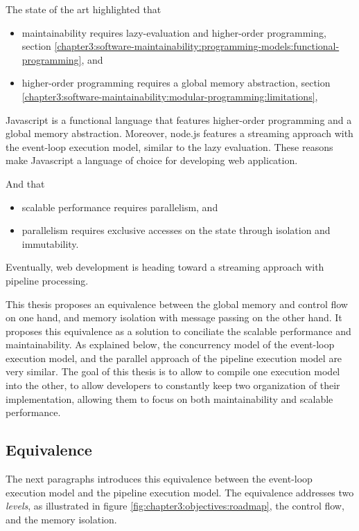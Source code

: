 The state of the art highlighted that
\begin{itemize}
\item maintainability requires lazy-evaluation and higher-order programming, section \ref{chapter3:software-maintainability:programming-models:functional-programming}, and
\item higher-order programming requires a global memory abstraction, section \ref{chapter3:software-maintainability:modular-programming:limitations},
\end{itemize}
Javascript is a functional language that features higher-order programming and a global memory abstraction.
Moreover, node.js features a streaming approach with the event-loop execution model, similar to the lazy evaluation.
These reasons make Javascript a language of choice for developing web application.

And that
\begin{itemize}
\item scalable performance requires parallelism, and
\item parallelism requires exclusive accesses on the state through isolation and immutability.
\end{itemize}
Eventually, web development is heading toward a streaming approach with pipeline processing.


This thesis proposes an equivalence between the global memory and control flow on one hand, and memory isolation with message passing on the other hand.
It proposes this equivalence as a solution to conciliate the scalable performance and maintainability.
As explained below, the concurrency model of the event-loop execution model, and the parallel approach of the pipeline execution model are very similar.
The goal of this thesis is to allow to compile one execution model into the other, to allow developers to constantly keep two organization of their implementation, allowing them to focus on both maintainability and scalable performance.

\subsection{Equivalence}

The next paragraphs introduces this equivalence between the event-loop execution model and the pipeline execution model.
The equivalence addresses two \textit{levels}, as illustrated in figure \ref{fig:chapter3:objectives:roadmap}, the control flow, and the memory isolation.

